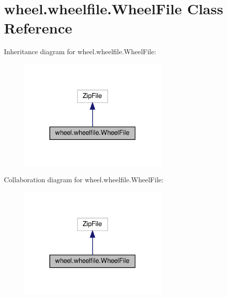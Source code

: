 \hypertarget{classwheel_1_1wheelfile_1_1WheelFile}{}\section{wheel.\+wheelfile.\+Wheel\+File Class Reference}
\label{classwheel_1_1wheelfile_1_1WheelFile}


Inheritance diagram for wheel.\+wheelfile.\+Wheel\+File\+:
\nopagebreak
\begin{figure}[H]
\begin{center}
\leavevmode
\includegraphics[width=210pt]{classwheel_1_1wheelfile_1_1WheelFile__inherit__graph}
\end{center}
\end{figure}


Collaboration diagram for wheel.\+wheelfile.\+Wheel\+File\+:
\nopagebreak
\begin{figure}[H]
\begin{center}
\leavevmode
\includegraphics[width=210pt]{classwheel_1_1wheelfile_1_1WheelFile__coll__graph}
\end{center}
\end{figure}
